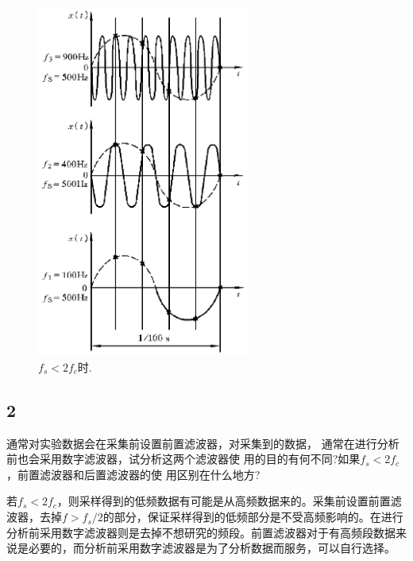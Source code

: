 \documentclass[12pt]{article}
\begin{document}
\begin{figure}[ht]
	\centering
	\includegraphics[width=7cm]{tex/1.png}
	\caption{$f_s < 2f_c$时.}
	\label{fig:31}
\end{figure}




\subsection{2}

通常对实验数据会在采集前设置前置滤波器，对采集到的数据， 通常在进行分析前也会采用数字滤波器，试分析这两个滤波器使 用的目的有何不同?如果$f_s<2f_c$，前置滤波器和后置滤波器的使 用区别在什么地方?

若$f_s<2f_c$，则采样得到的低频数据有可能是从高频数据来的。采集前设置前置滤波器，去掉$f>f_s/2$的部分，保证采样得到的低频部分是不受高频影响的。在进行分析前采用数字滤波器则是去掉不想研究的频段。前置滤波器对于有高频段数据来说是必要的，而分析前采用数字滤波器是为了分析数据而服务，可以自行选择。







% 
\end{document}
